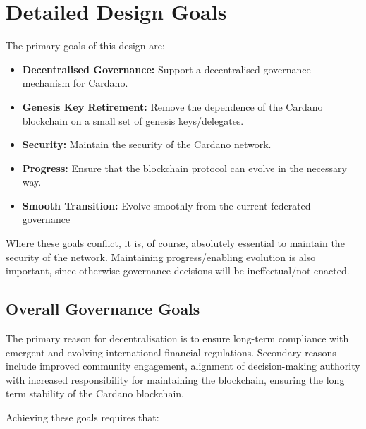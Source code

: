 \section{Detailed Design Goals}
\label{sect:goals}

The primary goals of this design are:

\begin{itemize}
\item
  \textbf{Decentralised Governance:}
  Support a decentralised governance mechanism for Cardano.
\item
  \textbf{Genesis Key Retirement:}
  Remove the dependence of the Cardano blockchain on a small set of genesis keys/delegates.
\item
  \textbf{Security:}
  Maintain the security of the Cardano network.
\item
  \textbf{Progress:}
  Ensure that the blockchain protocol can evolve in the necessary way.
\item
  \textbf{Smooth Transition:}
  Evolve smoothly from the current federated governance
\end{itemize}

Where these goals conflict, it is, of course, absolutely essential to maintain the security of the network.  Maintaining progress/enabling
evolution is also important, since otherwise governance decisions will be ineffectual/not enacted.

\subsection{Overall Governance Goals}

The primary reason for decentralisation is to ensure long-term compliance with emergent and evolving international financial regulations.
Secondary reasons include improved community engagement, alignment of decision-making authority with increased responsibility for maintaining the blockchain,
ensuring the long term stability of the Cardano blockchain.

Achieving these goals requires that:


